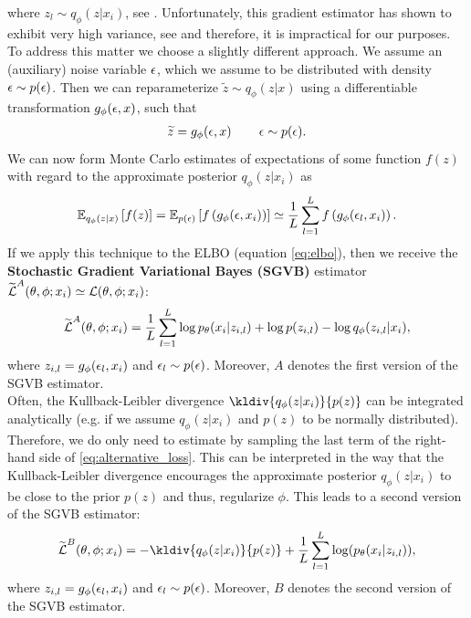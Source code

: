 where $z_l \sim q_{\phi}(z|x_i)$, see \cite[Section~2.2]{kingma2013auto}. Unfortunately, this gradient estimator has shown to exhibit very high variance, see \cite{paisley2012variational} and therefore, it is impractical for our purposes. To address this matter we choose a slightly different approach. We assume an (auxiliary) noise variable $\operatorname{\epsilon}$, which we assume to be distributed with density $\operatorname{\epsilon}\sim p(\operatorname{\epsilon})$. Then we can reparameterize $\tilde{z}\sim q_{\phi}(z|x)$ using a differentiable transformation $g_{\phi}(\operatorname{\epsilon}, x)$, such that
\begin{align*}
\widetilde{z} = g_{\phi} (\operatorname{\epsilon}, x)\qquad \operatorname{\epsilon} \sim p(\operatorname{\epsilon}).
\end{align*}
We can now form Monte Carlo estimates of expectations of some function $f(z)$ with regard to the approximate posterior $q_{\phi}(z|x_i)$ as
\begin{align*}
\operatorname{\mathbb{E}}_{q_{\phi}(z|x)} \left[ f(z) \right] = \operatorname{\mathbb{E}}_{p(\operatorname{\epsilon})} \left[ f\left(g_{\phi} (\operatorname{\epsilon}, x_i)\right) \right] \simeq \frac{1}{L} \sum_{l=1}^L f\left(g_{\phi} (\operatorname{\epsilon}_l, x_i) \right).
\end{align*}
If we apply this technique to the ELBO (equation \eqref{eq:elbo}), then we receive the \textbf{Stochastic Gradient Variational Bayes (SGVB)} estimator $\widetilde{\operatorname{\mathcal{L}}}^{A}(\theta, \phi; x_i) \simeq \operatorname{\mathcal{L}}(\theta, \phi; x_i)$:
\begin{align*}
\widetilde{\operatorname{\mathcal{L}}}^{A}(\theta, \phi; x_i) = \frac{1}{L} \sum_{l=1}^L \log  p_{\theta}(x_i|z_{i,l}) + \log p(z_{i,l}) - \log q_{\phi}(z_{i,l}|x_i),
\end{align*}
where $z_{i,l} = g_{\phi} (\operatorname{\epsilon}_l, x_i)$ and $\operatorname{\epsilon}_l\sim p(\operatorname{\epsilon})$. Moreover, $A$ denotes the first version of the SGVB estimator.\\
Often, the Kullback-Leibler divergence $\kldiv{q_{\phi}(z|x_i)}{p(z)}$ can be integrated analytically (e.g. if we assume $q_{\phi}(z|x_i)$ and $p(z)$ to be normally distributed). Therefore, we do only need to estimate by sampling the last term of the right-hand side of \eqref{eq:alternative_loss}. This can be interpreted in the way that the Kullback-Leibler divergence encourages the approximate posterior $q_{\phi}(z|x_i)$ to be close to the prior $p(z)$ and thus, regularize $\phi$. This leads to a second version of the SGVB estimator:
\begin{align}\label{eq:loss_batched}
\tilde{\loss}^{B}(\t, \phi; x_i) = - \kldiv{q_{\phi}(z|x_i)}{p(z)} + \frac{1}{L} \sum_{l=1}^L \log(p_{\t}(x_i|z_{i,l})),
\end{align}
where $z_{i,l} = g_{\phi} (\operatorname{\epsilon}_l, x_i)$ and $\operatorname{\epsilon}_l\sim p(\operatorname{\epsilon})$. Moreover, $B$ denotes the second version of the SGVB estimator.\\
